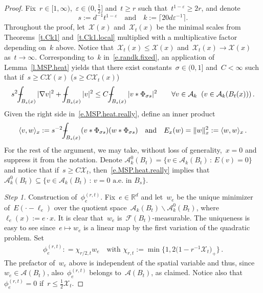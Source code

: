 \documentclass[11pt,twoside]{article} %
\numberwithin{equation}{section}
\theoremstyle{definition}
\newcommand*{\R}{\ensuremath{\mathbb{R}}}
\newcommand{\eps}{\varepsilon}
\newcommand{\qand}{\quad \mbox{and} \quad }
\newcommand{\ep}{\eps}
\newcommand{\F}{\mathcal{F}}
\newcommand{\X}{\mathcal{X}}
\newcommand{\minscale}{\chi}
\def\Xint#1{\mathchoice
{\XXint\displaystyle\textstyle{#1}}%
{\XXint\textstyle\scriptstyle{#1}}%
{\XXint\scriptstyle\scriptscriptstyle{#1}}%
{\XXint\scriptscriptstyle\scriptscriptstyle{#1}}%
\!\int}
\def\XXint#1#2#3{{\setbox0=\hbox{$#1{#2#3}{\int}$}
\vcenter{\hbox{$#2#3$}}\kern-.5\wd0}}
\def\fint{\Xint-}
\newcommand{\A}{\mathcal{A}}
\begin{document}
\begin{proof}
Fix~$r \in [1,\infty)$,~$\ep \in (0,\frac12]$ and~$t \geq r$ such that~$t^{1-\ep} \geq 2r$, and denote
\begin{equation}  \label{e.randk.fixed}
s :=d^{-1}  t^{1-\ep}
\qand
k := \lceil 20d \ep^{-1}  \rceil.
\end{equation}
Throughout the proof, let~$\X(x)$ and~$\X_t(x)$ be the minimal scales from Theorems~\ref{t.Ck1} and~\ref{t.Ck1.local} multiplied with a multiplicative factor depending on~$k$ above. Notice that~$\X_t(x) \leq \X(x)$ and~$\X_t(x) \to \X(x)$ as~$t \to \infty$. Corresponding to~$k$ in~\eqref{e.randk.fixed}, an application of Lemma~\ref{l.MSP.heat} yields that there exist constants~$\sigma \in (0,1]$ and~$C<\infty$ such that if~$s \geq C\X(x)$ ($s \geq C\X_t(x)$)
\begin{align} \label{e.MSP.heat.really}
s^2 \fint_{B_{s}(x) } | \nabla  v|^2 + \fint_{B_{s}(x) } | v|^2 
\leq 
C \fint_{ B_{s}(x)} | v \ast \Phi_{\sigma s}|^2 
\qquad \forall v \in \A_k  \; \; (v \in \A_k(B_t(x)) ) 
\, .
\end{align}
Given the right side in~\eqref{e.MSP.heat.really}, define an inner product
\begin{align}  \label{e.innerproduct}
\langle v,w\rangle_x
:= 
s^{-2}
\fint_{ B_{s}(x) } (v \ast \Phi_{\sigma s}) (w \ast \Phi_{\sigma s})
\qand
E_x(w) = \| w\|_x^2 := \langle w,w\rangle_x
\,. 
\end{align}
For the rest of the argument, we may take, without loss of generality,~$x=0$ and suppress it from the notation. Denote 
$\A_k^{0}(B_t) = \{ v \in \A_k(B_t) \, : \, E(v) = 0 \}$ and notice that if~$s \geq C\X_t$, then~\eqref{e.MSP.heat.really} implies that 
$\A_k^{0}(B_t) \subseteq \{ v \in \A_k(B_t) \, : \, v = 0 \mbox{ a.e. in } B_s \}$. 

\smallskip

\emph{Step 1.} Construction of~$\phi_e^{(r,t)}$.  
Fix~$e \in \R^d$ and let~$w_e$ be the unique minimizer of~$E(\cdot-\ell_e)$ over the quotient space~$\A_{k}(B_t) \backslash \A_k^{0}(B_t)$, where~$\ell_e(x) := e \cdot x$. It is clear that~$w_e$ is~$\F(B_t)$-measurable. The uniqueness is easy to see since~$e \mapsto w_e$ is a linear map by the first variation of the quadratic problem. 
Set 
\begin{align}  \label{e.localcorrdef}
\phi_{e}^{(r,t)}  : = \minscale_{r/2, t} w_e  
\quad \mbox{with } 
\minscale_{r, t} := \min\big\{1, 2 \bigl(1 -   r^{-1} \X_t \bigr)_+ \big\} 
\,.
\end{align}
The prefactor of~$w_e$ above is independent of the spatial variable and thus, since~$w_e \in \A(B_t)$, also~$\phi_{e}^{(r,t)}$ belongs to~$\A(B_t)$, as claimed.  Notice also that~$\phi_{e}^{(r,t)}=0$ if~$r \leq \frac12 \X_t$. 


\end{proof}
\end{document}
